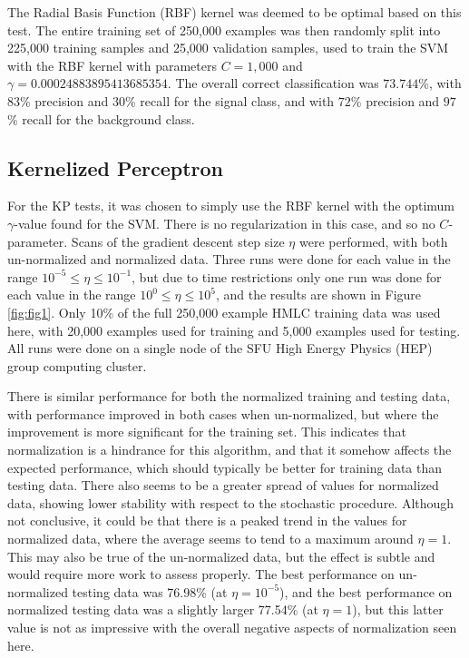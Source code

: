 \documentclass          {article} %
\begin{document}
The Radial Basis Function (RBF) kernel was deemed to be optimal based on this test. The entire training set of 250,000 examples was then randomly split into 225,000 training samples and 25,000 validation samples, used to train the SVM with the RBF kernel with parameters $C=1,000$ and $\gamma=0.00024883895413685354$. The overall correct classification was $73.744$\%, with $83$\% precision and $30$\% recall for the signal class, and with $72$\% precision and $97$\% recall for the background class.

            \subsection {Kernelized Perceptron}
            \label      {kernelized_perceptron}
For the KP tests, it was chosen to simply use the RBF kernel with the optimum $\gamma$-value found for the SVM. There is no regularization in this case, and so no $C$-parameter. Scans of the gradient descent step size $\eta$ were performed, with both un-normalized and normalized data. Three runs were done for each value in the range $10^{-5}\le\eta\le10^{-1}$, but due to time restrictions only one run was done for each value in the range $10^{0}\le\eta\le10^{5}$, and the results are shown in Figure \ref{fig:fig1}. Only 10\% of the full 250,000 example HMLC training data was used here, with 20,000 examples used for training and 5,000 examples used for testing. All runs were done on a single node of the SFU High Energy Physics (HEP) group computing cluster.

There is similar performance for both the normalized training and testing data, with performance improved in both cases when un-normalized, but where the improvement is more significant for the training set. This indicates that normalization is a hindrance for this algorithm, and that it somehow affects the expected performance, which should typically be better for training data than testing data. There also seems to be a greater spread of values for normalized data, showing lower stability with respect to the stochastic procedure. Although not conclusive, it could be that there is a peaked trend in the values for normalized data, where the average seems to tend to a maximum around $\eta=1$. This may also be true of the un-normalized data, but the effect is subtle and would require more work to assess properly. The best performance on un-normalized testing data was 76.98\% (at $\eta=10^{-5}$), and the best performance on normalized testing data was a slightly larger 77.54\% (at $\eta=1$), but this latter value is not as impressive with the overall negative aspects of normalization seen here.
\end{document}
